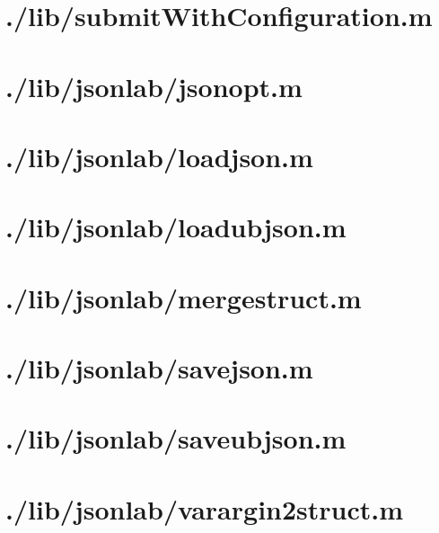 \documentclass{article}
\begin{document}
\section{./lib/submitWithConfiguration.m}

\section{./lib/jsonlab/jsonopt.m}

\section{./lib/jsonlab/loadjson.m}

\section{./lib/jsonlab/loadubjson.m}

\section{./lib/jsonlab/mergestruct.m}

\section{./lib/jsonlab/savejson.m}

\section{./lib/jsonlab/saveubjson.m}

\section{./lib/jsonlab/varargin2struct.m}

\end{document}
